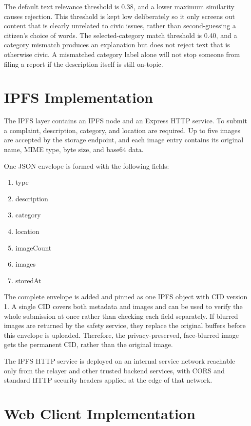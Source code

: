 The default text relevance threshold is 0.38, and a lower maximum similarity causes rejection. This threshold is kept low deliberately so it only screens out content that is clearly unrelated to civic issues, rather than second-guessing a citizen's choice of words. The selected-category match threshold is 0.40, and a category mismatch produces an explanation but does not reject text that is otherwise civic. A mismatched category label alone will not stop someone from filing a report if the description itself is still on-topic.

\section{IPFS Implementation}
\label{sec:ipfs-implementation}

The IPFS layer contains an IPFS node and an Express HTTP service. To submit a complaint, description, category, and location are required. Up to five images are accepted by the storage endpoint, and each image entry contains its original name, MIME type, byte size, and base64 data.

One JSON envelope is formed with the following fields:

\begin{enumerate}
    \item type
    \item description
    \item category
    \item location
    \item imageCount
    \item images
    \item storedAt
\end{enumerate}

The complete envelope is added and pinned as one IPFS object with \ac{CID} version 1. A single \ac{CID} covers both metadata and images and can be used to verify the whole submission at once rather than checking each field separately. If blurred images are returned by the safety service, they replace the original buffers before this envelope is uploaded. Therefore, the privacy-preserved, face-blurred image gets the permanent \ac{CID}, rather than the original image.

The IPFS HTTP service is deployed on an internal service network reachable only from the relayer and other trusted backend services, with CORS and standard HTTP security headers applied at the edge of that network.

\section{Web Client Implementation}
\label{sec:web-client-implementation}

